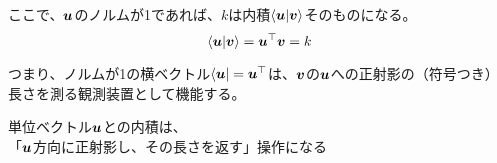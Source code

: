 \documentclass[../../../topic_linear-algebra]{subfiles}
\begin{document}
\br

ここで、$\vb*{u}$のノルムが1であれば、$k$は内積$\braket{\vb*{u}|\vb*{v}}$そのものになる。
\begin{equation*}
  \braket{\vb*{u}|\vb*{v}} = \vb*{u}^\top \vb*{v} = k
\end{equation*}

つまり、ノルムが1の横ベクトル$\bra{\vb*{u}} = \vb*{u}^\top$は、$\vb*{v}$の$\vb*{u}$への正射影の（符号つき）長さを測る観測装置として機能する。

\begin{emphabox}
  \begin{spacebox}
    \begin{center}
      単位ベクトル$\vb*{u}$との内積は、\\
      「$\vb*{u}$方向に正射影し、その長さを返す」操作になる
    \end{center}
  \end{spacebox}
\end{emphabox}
\end{document}
